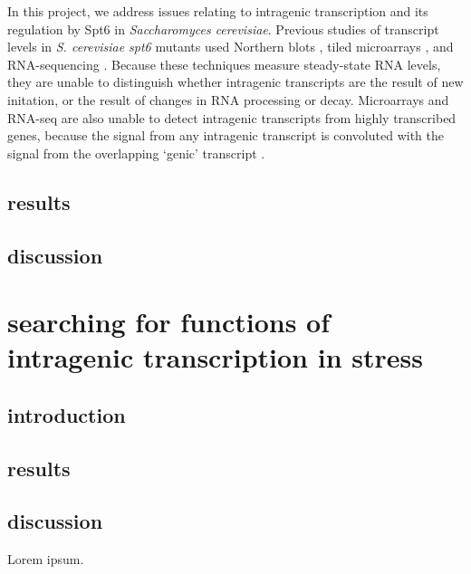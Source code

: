 \documentclass[11pt, a4paper]{article}
\begin{document}

In this project, we address issues relating to intragenic transcription and its regulation by Spt6 in \textit{Saccharomyces cerevisiae}. Previous studies of transcript levels in \textit{S. cerevisiae spt6} mutants used Northern blots \cite{kaplan2003}, tiled microarrays \cite{cheung2008}, and RNA-sequencing \cite{uwimana2017}. Because these techniques measure steady-state RNA levels, they are unable to distinguish whether intragenic transcripts are the result of new initation, or the result of changes in RNA processing or decay. Microarrays and RNA-seq are also unable to detect intragenic transcripts from highly transcribed genes, because the signal from any intragenic transcript is convoluted with the signal from the overlapping `genic' transcript \cite{cheung2008, lickwar2009}.

\subsection{results}
\subsection{discussion}

\section{searching for functions of intragenic transcription in stress}
\subsection{introduction}
\subsection{results}
\subsection{discussion}

Lorem ipsum.

{}

\end{document}

